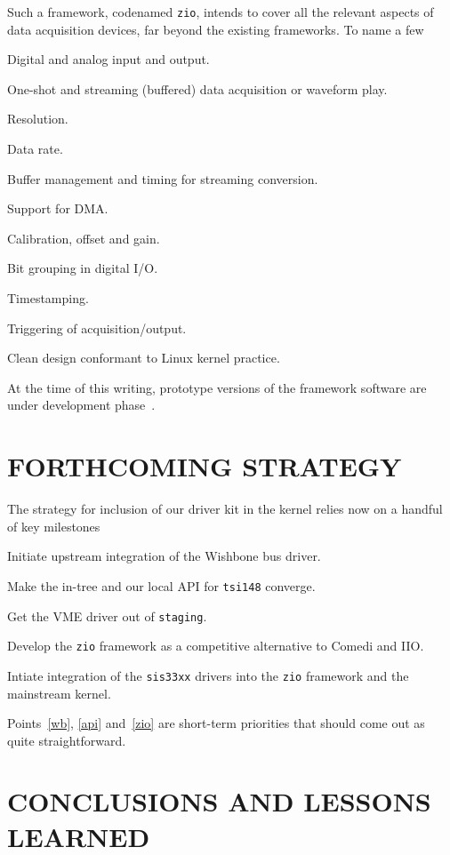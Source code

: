 \documentclass{JAC2003}
\begin{document}
Such a framework, codenamed \texttt{zio},
intends to cover all the relevant aspects of data acquisition devices,
far beyond the existing frameworks. To name a few
\begin{Itemize}
\item Digital and analog input and output.
\item One-shot and streaming (buffered) data acquisition or waveform play.
\item Resolution.
\item Data rate.
\item Buffer management and timing for streaming conversion.
\item Support for DMA.
\item Calibration, offset and gain.
\item Bit grouping in digital I/O.
\item Timestamping.
\item Triggering of acquisition/output.
\item Clean design conformant to Linux kernel practice.
\end{Itemize}
At the time of this writing, prototype versions of the framework software
are under development phase~\cite{zio-git}.

\section{FORTHCOMING STRATEGY}

The strategy for inclusion of our driver kit in the kernel relies now on
a handful of key milestones
\begin{Enumerate}
\item Initiate upstream integration of the Wishbone bus driver.
	\label{wb}
\item Make the in-tree and our local API for \verb|tsi148| converge.
	\label{api}
\item Get the VME driver out of \texttt{staging}.
\item Develop the \texttt{zio} framework as a competitive alternative
	to Comedi and IIO.
	\label{zio}
\item Intiate integration of the \texttt{sis33xx} drivers into the
    \texttt{zio} framework and the mainstream kernel.
\end{Enumerate}
Points~\ref{wb}, \ref{api} and~\ref{zio} are short-term priorities that
should come out as quite straightforward.

\section{CONCLUSIONS AND LESSONS LEARNED}
\end{document}
